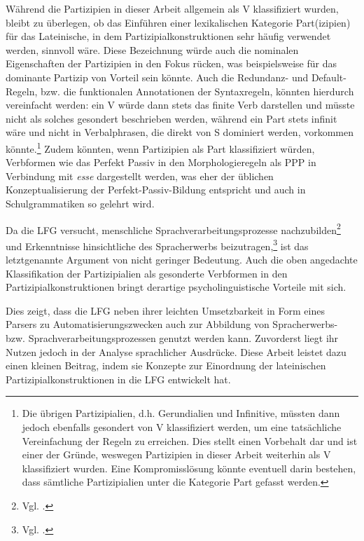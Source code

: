 \documentclass[12pt,a4paper]{article}
\begin{document}
Während die Partizipien in dieser Arbeit allgemein als V klassifiziert wurden, bleibt zu überlegen, ob das Einführen einer lexikalischen Kategorie Part(izipien) für das Lateinische, in dem Partizipialkonstruktionen sehr häufig verwendet werden, sinnvoll wäre. Diese Bezeichnung würde auch die nominalen Eigenschaften der Partizipien in den Fokus rücken, was beispielsweise für das dominante Partizip von Vorteil sein könnte.
Auch die Redundanz- und Default-Regeln, bzw. die funktionalen Annotationen der Syntaxregeln, könnten hierdurch vereinfacht werden: ein V würde dann stets das finite Verb darstellen und müsste nicht als solches gesondert beschrieben werden, während ein Part stets infinit wäre und nicht in Verbalphrasen, die direkt von S dominiert werden, vorkommen könnte.\footnote{Die übrigen Partizipialien, d.h. Gerundialien und Infinitive, müssten dann jedoch ebenfalls gesondert von V klassifiziert werden, um eine tatsächliche Vereinfachung der Regeln zu erreichen. Dies stellt einen Vorbehalt dar und ist einer der Gründe, weswegen Partizipien in dieser Arbeit weiterhin als V klassifiziert wurden. Eine Kompromisslösung könnte eventuell darin bestehen, dass sämtliche Partizipialien unter die Kategorie Part gefasst werden.} Zudem könnten, wenn Partizipien als Part klassifiziert würden, Verbformen wie das Perfekt Passiv in den Morphologieregeln als PPP in Verbindung mit \textit{esse} dargestellt werden, was eher der üblichen Konzeptualisierung der Perfekt-Passiv-Bildung entspricht und auch in Schulgrammatiken so gelehrt wird. 

Da die LFG versucht, menschliche Sprachverarbeitungsprozesse nachzubilden\footnote{Vgl. \cite[12; 60]{Rohrer}.} und Erkenntnisse hinsichtliche des Spracherwerbs beizutragen,\footnote{Vgl. \cite[21]{DAZ}.} ist das letztgenannte Argument von nicht geringer Bedeutung. Auch die oben angedachte Klassifikation der Partizipialien als gesonderte Verbformen in den Partizipialkonstruktionen bringt derartige psycholinguistische Vorteile mit sich.

Dies zeigt, dass die LFG neben ihrer leichten Umsetzbarkeit in Form eines Parsers zu Automatisierungszwecken auch zur Abbildung von Spracherwerbs- bzw. Sprachverarbeitungsprozessen genutzt werden kann. Zuvorderst liegt ihr Nutzen jedoch in der Analyse sprachlicher Ausdrücke. Diese Arbeit leistet dazu einen kleinen Beitrag, indem sie Konzepte zur Einordnung der lateinischen Partizipialkonstruktionen in die LFG entwickelt hat.

%
\pagebreak
\printbibliography
\end{document}
